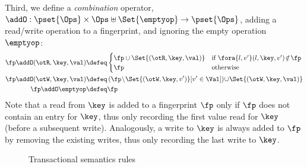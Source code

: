 Third, we define a \emph{combination} operator,
$\addO  : \pset{\Ops} \times \Ops \uplus \Set{\emptyop} \to \pset{\Ops}$, 
adding a read/write operation to a fingerprint, and ignoring the empty operation $\emptyop$:%
\[
\begin{aligned}
    \fp \addO (\otR, \key, \val)  
    & \defeq
    \begin{cases}
        \fp \cup \Set{(\otR, \key, \val)} & \text{if } \fora{l, v'} (l, \key, v') \! \notin \! \fp \\
        \fp &  \text{otherwise} \\
    \end{cases}  \\
    \fp \addO (\otW, \key, \val) 
    & \defeq 
    \left( \fp \! \setminus \! \Set{(\otW, \key, v')}[v' \in \Val] \right)  \!
    \cup \! \Set{(\otW, \key, \val)} \\
    \fp \addO \emptyop  & \defeq \fp 
\end{aligned}
\]
Note that a read from $\key$ is added to a fingerprint $\fp$ only if $\fp$ does not contain an entry for $\key$, thus only recording the first value read for $\key$ (before a subsequent write). 
Analogously, a write to $\key$ is always added to $\fp$ by removing the existing writes, thus only recording the last write to $\key$. 

%
\begin{figure*}[!t]
\hrulefill

\captionsetup{belowskip=-5pt}
\caption{Transactional semantics rules}
\label{fig:semantics-trans}
\end{figure*}

